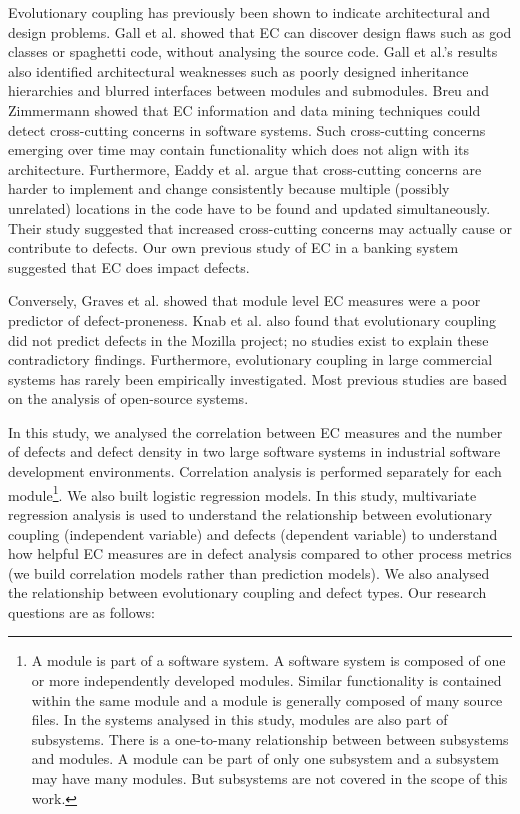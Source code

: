 \documentclass[times]{smrauth}
\begin{document}
Evolutionary coupling has previously been shown to indicate architectural and design problems. Gall et al. \cite{gall1998detection} \cite{gall2003cvs} showed that EC can discover design flaws such as god classes or spaghetti code, without analysing the source code. Gall et al.'s results also identified architectural weaknesses such as poorly designed inheritance hierarchies and blurred interfaces between modules and submodules. Breu and Zimmermann \cite{breu2006mining} showed that EC information and data mining techniques could detect cross-cutting concerns in software systems. Such cross-cutting concerns emerging over time may contain functionality which does not align with its architecture. Furthermore, Eaddy et al. \cite{eaddy2008crosscutting} argue that cross-cutting concerns are harder to implement and change consistently because multiple (possibly unrelated) locations in the code have to be found and updated simultaneously. Their study suggested that increased cross-cutting concerns may actually cause or contribute to defects. Our own previous study of EC in a banking system \cite{Kirbas:2014:EEC:2652524.2652577} suggested that EC does impact defects.


Conversely, Graves et al. \cite{graves2000predicting} showed that module level EC measures were a poor predictor of defect-proneness. Knab et al. \cite{knab2006predicting} also found that evolutionary coupling did not predict defects in the Mozilla project; no studies exist to explain these contradictory findings. Furthermore, evolutionary coupling in large commercial systems has rarely been empirically investigated. Most previous studies are based on the analysis of open-source systems.

In this study, we analysed the correlation between EC measures and the number of defects and defect density in two large software systems in industrial software development environments. Correlation analysis is performed separately for each module\footnote{A module is part of a software system. A software system is composed of one or more independently developed modules. Similar functionality is contained within the same module and a module is generally composed of many source files. In the systems analysed in this study, modules are also part of subsystems. There is a one-to-many relationship between between subsystems and modules. A module can be part of only one subsystem and a subsystem may have many modules. But subsystems are not covered in the scope of this work.}. We also built logistic regression models. In this study, multivariate regression analysis is used to understand the relationship between evolutionary coupling (independent variable) and defects (dependent variable) to understand how helpful EC measures are in defect analysis compared to other process metrics (we build correlation models rather than prediction models). We also analysed the relationship between evolutionary coupling and defect types. Our research questions are as follows:
\end{document}
